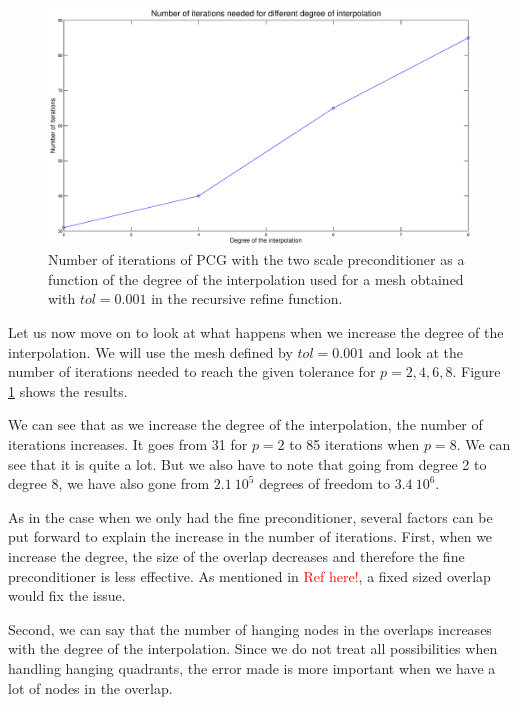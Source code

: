 \begin{figure}
\centering
\includegraphics[scale=0.35]{Results/two_hang_deg.eps}
\caption{Number of iterations of PCG with the two scale preconditioner as a function of the degree of the interpolation used for a mesh obtained with $tol = 0.001$ in the recursive refine function.}
\label{two_hang_deg}
\end{figure}

Let us now move on to look at what happens when we increase the degree of the interpolation. We will use the mesh defined by $tol = 0.001$ and look at the number of iterations needed to reach the given tolerance for $p=2,4,6,8$. Figure \ref{two_hang_deg} shows the results. 

We can see that as we increase the degree of the interpolation, the number of iterations increases. It goes from 31 for $p=2$ to 85 iterations when $p=8$. We can see that it is quite a lot. But we also have to note that going from degree 2 to degree 8, we have also gone from $2.1\:10^5$ degrees of freedom to $3.4\:10^6$.

As in the case when we only had the fine preconditioner, several factors can be put forward to explain the increase in the number of iterations. First, when we increase the degree, the size of the overlap decreases and therefore the fine preconditioner is less effective. As mentioned in \textcolor{red}{Ref here!}, a fixed sized overlap would fix the issue. 

Second, we can say that the number of hanging nodes in the overlaps increases with the degree of the interpolation. Since we do not treat all possibilities when handling hanging quadrants, the error made is more important when we have a lot of nodes in the overlap.

